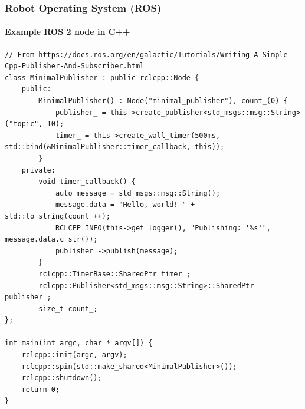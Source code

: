 \begin{frame}[fragile]
\frametitle{Robot Operating System (ROS)}
\framesubtitle{Example ROS 2 node in C++}
\tiny
\begin{verbatim}
// From https://docs.ros.org/en/galactic/Tutorials/Writing-A-Simple-Cpp-Publisher-And-Subscriber.html
class MinimalPublisher : public rclcpp::Node {
    public:
        MinimalPublisher() : Node("minimal_publisher"), count_(0) {
            publisher_ = this->create_publisher<std_msgs::msg::String>("topic", 10);
            timer_ = this->create_wall_timer(500ms, std::bind(&MinimalPublisher::timer_callback, this));
        }
    private:
        void timer_callback() {
            auto message = std_msgs::msg::String();
            message.data = "Hello, world! " + std::to_string(count_++);
            RCLCPP_INFO(this->get_logger(), "Publishing: '%s'", message.data.c_str());
            publisher_->publish(message);
        }
        rclcpp::TimerBase::SharedPtr timer_;
        rclcpp::Publisher<std_msgs::msg::String>::SharedPtr publisher_;
        size_t count_;
};

int main(int argc, char * argv[]) {
    rclcpp::init(argc, argv);
    rclcpp::spin(std::make_shared<MinimalPublisher>());
    rclcpp::shutdown();
    return 0;
}
\end{verbatim}
\end{frame}

